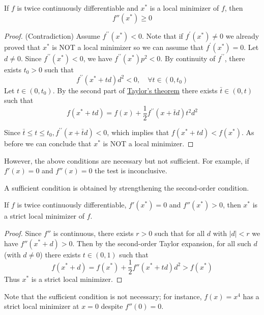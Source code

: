 \documentclass[9pt, headings=standardclasses, parskip=half]{scrartcl}
\begin{document}
\begin{theorem}
If \(f\) is twice continuously differentiable and \(x^*\) is a local minimizer of \(f\), then
\[
f''(x^*)\ge 0
\]
\end{theorem}
\begin{proof}
(Contradiction)
Assume $f^{\prime \prime}\left(x^*\right)<0$. Note that if $f^{\prime}\left(x^*\right) \neq 0$ we already proved that $x^*$ is NOT a local minimizer so we can assume that $f^{\prime}\left(x^*\right)=0$. Let $d \neq 0$. Since $f^{\prime \prime}\left(x^*\right)<0$, we have $f^{\prime \prime}\left(x^*\right) p^2<0$. By continuity of $f^{\prime \prime}$, there exists $t_0>0$ such that
$$
f^{\prime \prime}\left(x^*+t d\right) d^2<0, \quad \forall t \in\left(0, t_0\right)
$$
Let $t \in\left(0, t_0\right)$. By the second part of \hyperref[thm:univariate_taylor_expansion]{Taylor's theorem} there exists $\bar{t} \in(0, t)$ such that
$$
f\left(x^*+t d\right)=f(x)+\frac{1}{2} f^{\prime \prime}(x+\bar{t} d) t^2 d^2
$$


Since $\bar{t} \leq t \leq t_0, f^{\prime \prime}(x+\bar{t} d)<0$, which implies that $f\left(x^*+t d\right)<f\left(x^*\right)$. As before we can conclude that $x^*$ is NOT a local minimizer.
\end{proof}

However, the above conditions are necessary but not sufficient. For example, if \(f'(x)=0\) and \(f''(x)=0\) the test is inconclusive.

A sufficient condition is obtained by strengthening the second-order condition.

\begin{theorem}
If \(f\) is twice continuously differentiable, \(f'(x^*)=0\) and \(f''(x^*)>0\), then \(x^*\) is a strict local minimizer of \(f\).
\end{theorem}
\begin{proof}
Since \(f''\) is continuous, there exists \(r>0\) such that for all \(d\) with \(|d|<r\) we have \(f''(x^*+d)>0\). 
Then by the second-order Taylor expansion, for all such \(d\) (with \(d\ne0\)) there exists \(t\in(0,1)\) such that
\[
f(x^*+d)=f(x^*)+\frac{1}{2}f''\left(x^*+t d\right)d^2>f(x^*)
\]
Thus \(x^*\) is a strict local minimizer.
\end{proof}

\begin{remark}
Note that the sufficient condition is not necessary; for instance, \(f(x)=x^4\) has a strict local minimizer at \(x=0\) despite \(f''(0)=0\).
\end{remark}
\end{document}
